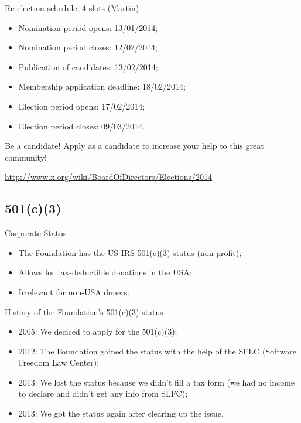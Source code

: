 \documentclass{beamer}
\begin{document}
		\begin{frame}
			\begin{block}{Re-election schedule, 4 slots (Martin)}
				\begin{itemize}
					\item Nomination period opens: 13/01/2014;
					\item Nomination period closes: 12/02/2014;
					\item Publication of candidates: 13/02/2014;
					\item Membership application deadline: 18/02/2014;
					\item Election period opens: 17/02/2014;
					\item Election period closes: 09/03/2014.
				\end{itemize}
			\end{block}

			\begin{block}{Be a candidate!}
				Apply as a candidate to increase your help to this great community!
			\end{block}

			\begin{block}{}
				\url{http://www.x.org/wiki/BoardOfDirectors/Elections/2014}
			\end{block}
		\end{frame}

		\subsection{501(c)(3)}
		\begin{frame}
			\begin{block}{Corporate Status}
				\begin{itemize}
					\item The Foundation has the US IRS 501(c)(3) status (non-profit);
					\item Allows for tax-deductible donations in the USA;
					\item Irrelevant for non-USA doners.
				\end{itemize}
			\end{block}

			\begin{block}{History of the Foundation's 501(c)(3) status}
				\begin{itemize}
					\item 2005: We deciced to apply for the 501(c)(3);
					\item 2012: The Foundation gained the status with the help
of the SFLC (Software Freedom Law Center);
					\item 2013: We lost the status because we didn't
fill a tax form (we had no income to declare and didn't get any info from SLFC);
					\item 2013: We got the status again after clearing up the issue.
				\end{itemize}
			\end{block}
		\end{frame}
\end{document}
